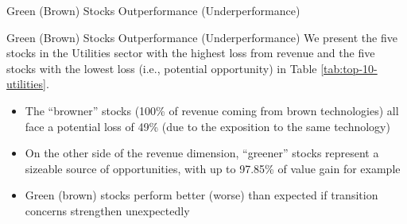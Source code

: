 \documentclass{beamer}
\begin{document}
\begin{frame}{Green (Brown) Stocks Outperformance (Underperformance)}
  \begin{table}
    \centering
    \small
    \caption{Summary statistics by sector: loss from revenue}
    \label{tab:loss-revenue}
  \end{table}
\end{frame}


\begin{frame}{Green (Brown) Stocks Outperformance (Underperformance)}
  We present the five stocks in the Utilities sector with the highest loss from revenue and the five stocks with the lowest loss (i.e., potential opportunity) in Table \ref{tab:top-10-utilities}.
  \begin{itemize}
    \item The “browner” stocks (100\% of revenue coming from brown technologies) all face a potential loss of 49\% (due to the exposition to the same technology)
    \item On the other side of the revenue dimension, “greener” stocks represent a sizeable source of opportunities, with up to 97.85\% of value gain for example
    \item Green (brown) stocks perform better (worse) than expected if transition concerns strengthen unexpectedly
  \end{itemize}
\end{frame}
\end{document}
